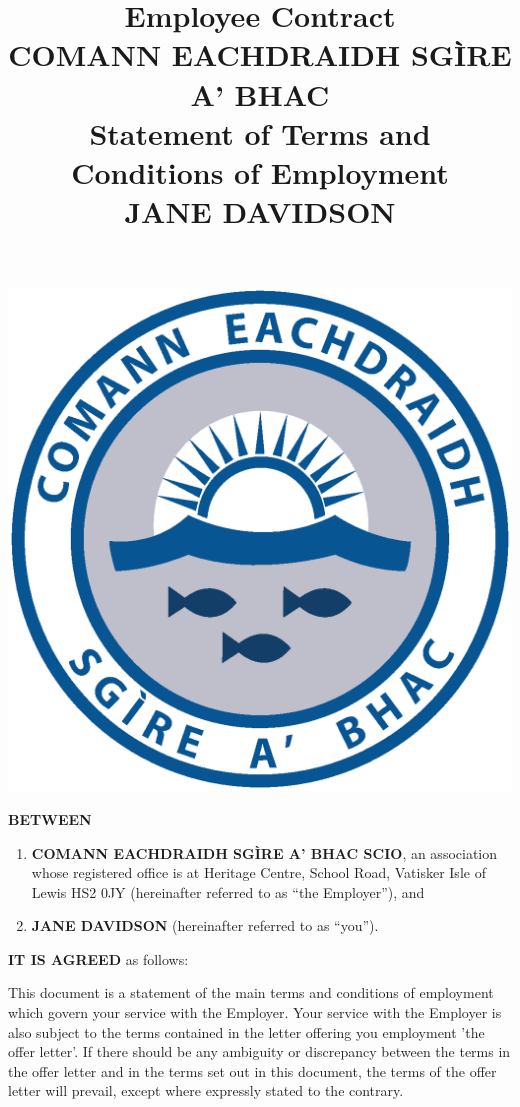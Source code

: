 \documentclass[a4paper,11pt,onecolumn ]{article}
\title{%
  Employee Contract \\
  COMANN EACHDRAIDH SGÌRE A' BHAC \\
  \large Statement of Terms and Conditions of Employment \\
  JANE DAVIDSON
  }
\begin{document}
\maketitle

\begin{center}
\includegraphics[width=0.3\paperwidth]{cebac-logo}
\end{center}

\pagebreak

\tableofcontents

\pagebreak


\textbf{BETWEEN}
\begin{enumerate}[label=\alph*)]
\item \textbf{COMANN EACHDRAIDH SGÌRE A' BHAC SCIO}, an association whose registered office is at 
Heritage Centre, School Road, Vatisker Isle of Lewis HS2 0JY (hereinafter referred to as 
``the Employer''), and

\item \textbf{JANE DAVIDSON} (hereinafter referred to as ``you'').
\end{enumerate}

\textbf{IT IS AGREED} as follows:



\begin{legal}
\item 
{}
This document is a statement of the main terms and conditions of employment
which govern your service with the Employer. Your service with the Employer is
also subject to the terms contained in the letter offering you employment 'the offer
letter'. If there should be any ambiguity or discrepancy between the terms in the
offer letter and in the terms set out in this document, the terms of the offer letter
will prevail, except where expressly stated to the contrary.
\end{legal}
\end{document}
